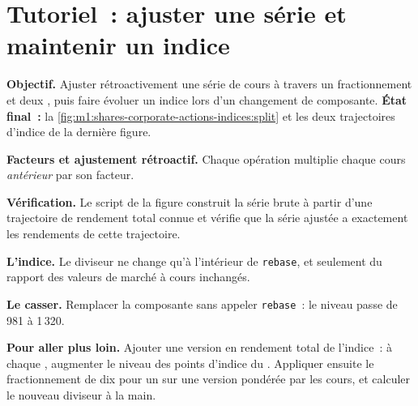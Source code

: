\section{Tutoriel~: ajuster une série et maintenir un indice}\label{tut:m1:shares-corporate-actions-indices:adjust}

\begin{tutorial}
\textbf{Objectif.} Ajuster rétroactivement une série de cours à travers un fractionnement et deux ,
puis faire évoluer un indice lors d'un changement de composante. \textbf{État final~:}
la \cref{fig:m1:shares-corporate-actions-indices:split} et les deux trajectoires d'indice
de la dernière figure.
\begin{tutsteps}
\item \textbf{Facteurs et ajustement rétroactif.} Chaque opération multiplie chaque
cours \emph{antérieur} par son facteur.
\label{lst:m1:shares-corporate-actions-indices:factors}
\label{lst:m1:shares-corporate-actions-indices:backadj}
\item \textbf{Vérification.} Le script de la figure construit la série brute à partir d'une
trajectoire de rendement total connue et vérifie que la série ajustée a exactement
les rendements de cette trajectoire.
\item \textbf{L'indice.} Le diviseur ne change qu'à l'intérieur de \texttt{rebase}, et
seulement du rapport des valeurs de marché à cours inchangés.
\label{lst:m1:shares-corporate-actions-indices:index}
\item \textbf{Le casser.} Remplacer la composante sans appeler
\texttt{rebase}~: le niveau passe de 981 à 1\,320.
\end{tutsteps}
\textbf{Pour aller plus loin.} Ajouter une version en rendement total de l'indice~: à chaque
, augmenter le niveau des points d'indice du . Appliquer ensuite le
fractionnement de dix pour un sur une version pondérée par les cours, et calculer le nouveau
diviseur à la main.
\end{tutorial}

